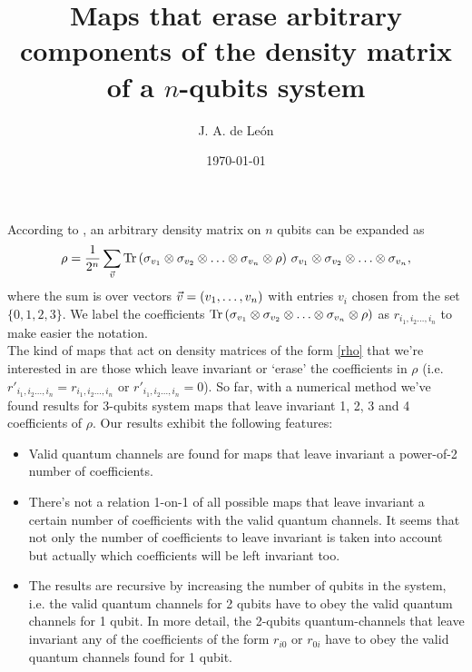 \documentclass[11pt]{article}
\begin{document}
\title{Maps that erase arbitrary components of the density matrix of a $n$-qubits system} %
\author{J. A. de Le\'on} 


\date{\today}  

\maketitle


According to \cite{nielsen_chuang_2011}, an arbitrary density matrix on $n$ qubits can be expanded as
\begin{align}
	\rho = \frac{1}{2^n}\sum _{\vec{v}} \Tr \qty( \sigma _{v_1} \otimes \sigma_{v_2} \otimes \ldots \otimes \sigma_{v_n} \otimes \rho )\  \sigma _{v_1} \otimes \sigma_{v_2} \otimes \ldots \otimes \sigma_{v_n},
	\label{rho}
\end{align}
where the sum is over vectors $\vec{v}=\qty(v_1,\ldots, v_n)$ with entries $v_i$ chosen from the set $\{0,1,2,3\}$. We label the coefficients $\Tr \qty( \sigma _{v_1} \otimes \sigma_{v_2} \otimes \ldots \otimes \sigma_{v_n} \otimes \rho )$ as $r_{i_1, i_2\ldots, i_n}$ to make easier the notation. \\

The kind of maps that act on density matrices of the form \eqref{rho} that we're interested in are those which leave invariant or
`erase' the coefficients in $\rho$ (i.e. $r'_{i_1, i_2\ldots, i_n}=r_{i_1, i_2\ldots, i_n}$ or $r'_{i_1, i_2\ldots, i_n}=0$). So far, with
a numerical method we've found results for 3-qubits system maps that leave invariant 1, 2, 3 and 4 coefficients of $\rho$. Our
results exhibit the following features:
\begin{itemize}
	\item Valid quantum channels are found for maps that leave invariant a power-of-2 number of coefficients.
	\item There's not a relation 1-on-1 of all possible maps that leave invariant a certain number of coefficients with the valid
	quantum channels. It seems that not only the number of coefficients to leave invariant is taken into account but actually
	which coefficients will be left invariant too.
	\item The results are recursive by increasing the number of qubits in the system, i.e. the valid quantum channels for 2
	qubits have to obey the valid quantum channels for 1 qubit. In more detail, the 2-qubits quantum-channels that leave
	invariant any of the coefficients of the form $r_{i0}$ or $r_{0i}$ have to obey the valid quantum channels found for 1
	qubit.
\end{itemize}
\end{document}
